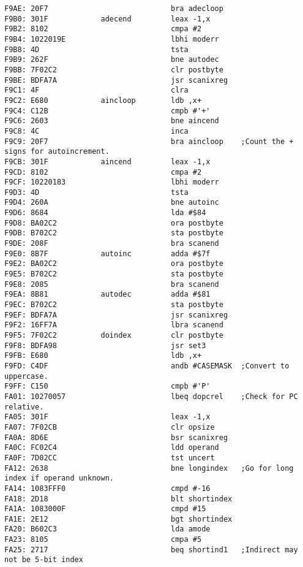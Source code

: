 {\begin{verbatim}
F9AE: 20F7                            bra adecloop
F9B0: 301F            adecend         leax -1,x
F9B2: 8102                            cmpa #2                         
F9B4: 1022019E                        lbhi moderr
F9B8: 4D                              tsta
F9B9: 262F                            bne autodec
F9BB: 7F02C2                          clr postbyte
F9BE: BDFA7A                          jsr scanixreg
F9C1: 4F                              clra
F9C2: E680            aincloop        ldb ,x+
F9C4: C12B                            cmpb #'+'
F9C6: 2603                            bne aincend
F9C8: 4C                              inca
F9C9: 20F7                            bra aincloop    ;Count the + signs for autoincrement.                   
F9CB: 301F            aincend         leax -1,x
F9CD: 8102                            cmpa #2
F9CF: 10220183                        lbhi moderr
F9D3: 4D                              tsta
F9D4: 260A                            bne autoinc
F9D6: 8684                            lda #$84
F9D8: BA02C2                          ora postbyte
F9DB: B702C2                          sta postbyte
F9DE: 208F                            bra scanend
F9E0: 8B7F            autoinc         adda #$7f
F9E2: BA02C2                          ora postbyte
F9E5: B702C2                          sta postbyte            
F9E8: 2085                            bra scanend
F9EA: 8B81            autodec         adda #$81
F9EC: B702C2                          sta postbyte
F9EF: BDFA7A                          jsr scanixreg
F9F2: 16FF7A                          lbra scanend
F9F5: 7F02C2          doindex         clr postbyte
F9F8: BDFA98                          jsr set3
F9FB: E680                            ldb ,x+
F9FD: C4DF                            andb #CASEMASK  ;Convert to uppercase.
F9FF: C150                            cmpb #'P'
FA01: 10270057                        lbeq dopcrel    ;Check for PC relative.
FA05: 301F                            leax -1,x
FA07: 7F02CB                          clr opsize
FA0A: 8D6E                            bsr scanixreg
FA0C: FC02C4                          ldd operand
FA0F: 7D02CC                          tst uncert
FA12: 2638                            bne longindex   ;Go for long index if operand unknown.
FA14: 1083FFF0                        cmpd #-16
FA18: 2D18                            blt shortindex
FA1A: 1083000F                        cmpd #15
FA1E: 2E12                            bgt shortindex
FA20: B602C3                          lda amode
FA23: 8105                            cmpa #5         
FA25: 2717                            beq shortind1   ;Indirect may not be 5-bit index        

\end{verbatim}}
